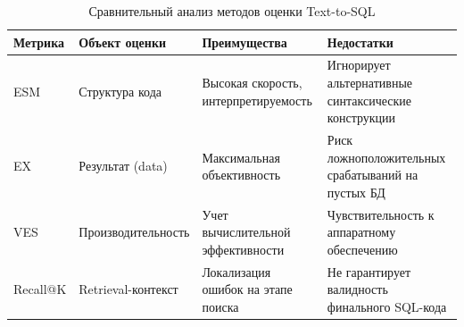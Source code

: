 \begin{table}[h!]
\centering
\caption{Сравнительный анализ методов оценки Text-to-SQL}
\label{table:metrics_comparison}
\begin{tabular}{|p{2cm}|p{2.5cm}|p{3.5cm}|p{4cm}|}
\hline
\textbf{Метрика} & \textbf{Объект оценки} & \textbf{Преимущества} & \textbf{Недостатки} \\ \hline
ESM & Структура кода & Высокая скорость, интерпретируемость & Игнорирует альтернативные синтаксические конструкции \\ \hline
EX & Результат (data) & Максимальная объективность & Риск ложноположительных срабатываний на пустых БД \\ \hline
VES & Производительность & Учет вычислительной эффективности & Чувствительность к аппаратному обеспечению \\ \hline
Recall@K & Retrieval-контекст & Локализация ошибок на этапе поиска & Не гарантирует валидность финального SQL-кода \\ \hline
\end{tabular}
\end{table}

